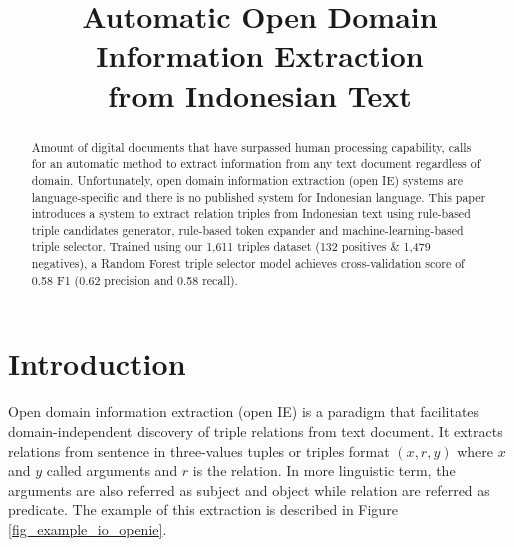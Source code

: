 \documentclass[conference,compsoc]{IEEEtran}
\begin{document}
\title{Automatic Open Domain Information Extraction\\from Indonesian Text}


\author{
	\and
}


\maketitle

\begin{abstract}

Amount of digital documents that have surpassed human processing capability, calls for an automatic method to extract information from any text document regardless of domain. Unfortunately, open domain information extraction (open IE) systems are language-specific and there is no published system for Indonesian language. This paper introduces a system to extract relation triples from Indonesian text using rule-based triple candidates generator, rule-based token expander and machine-learning-based triple selector. Trained using our 1,611 triples dataset (132 positives \& 1,479 negatives), a Random Forest triple selector model achieves cross-validation score of 0.58 F1 (0.62 precision and 0.58 recall).

\end{abstract}


\section{Introduction}

Open domain information extraction (open IE) is a paradigm that facilitates domain-independent discovery of triple relations from text document\cite{banko2007open}. It extracts relations from sentence in three-values tuples or triples format $(x, r, y)$ where $x$ and $y$ called arguments and $r$ is the relation\cite{etzioni2011open}. In more linguistic term, the arguments are also referred as subject and object while relation are referred as predicate\cite{angeli2015leveraging}. The example of this extraction is described in Figure \ref{fig_example_io_openie}.
\end{document}
